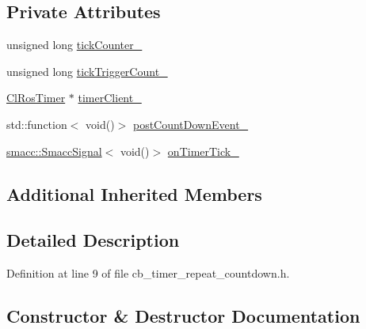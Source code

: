 \subsection*{Private Attributes}
\begin{DoxyCompactItemize}
\item 
unsigned long \hyperlink{classros__timer__client_1_1CbTimerRepeatCountdown_a8984335d1a5b7a1da50cd1698047125f}{tick\+Counter\+\_\+}
\item 
unsigned long \hyperlink{classros__timer__client_1_1CbTimerRepeatCountdown_a6e32f68d5e54787ee80732c1ce4b08f4}{tick\+Trigger\+Count\+\_\+}
\item 
\hyperlink{classros__timer__client_1_1ClRosTimer}{Cl\+Ros\+Timer} $\ast$ \hyperlink{classros__timer__client_1_1CbTimerRepeatCountdown_aa75e5963e7a1593d7f71ff821a5127b0}{timer\+Client\+\_\+}
\item 
std\+::function$<$ void()$>$ \hyperlink{classros__timer__client_1_1CbTimerRepeatCountdown_a007a6b8bb86c71b670b56851533a5ea9}{post\+Count\+Down\+Event\+\_\+}
\item 
\hyperlink{classsmacc_1_1SmaccSignal}{smacc\+::\+Smacc\+Signal}$<$ void()$>$ \hyperlink{classros__timer__client_1_1CbTimerRepeatCountdown_a22def81dfff50bf7a7d733e16cf14ce7}{on\+Timer\+Tick\+\_\+}
\end{DoxyCompactItemize}
\subsection*{Additional Inherited Members}


\subsection{Detailed Description}


Definition at line 9 of file cb\+\_\+timer\+\_\+repeat\+\_\+countdown.\+h.



\subsection{Constructor \& Destructor Documentation}
